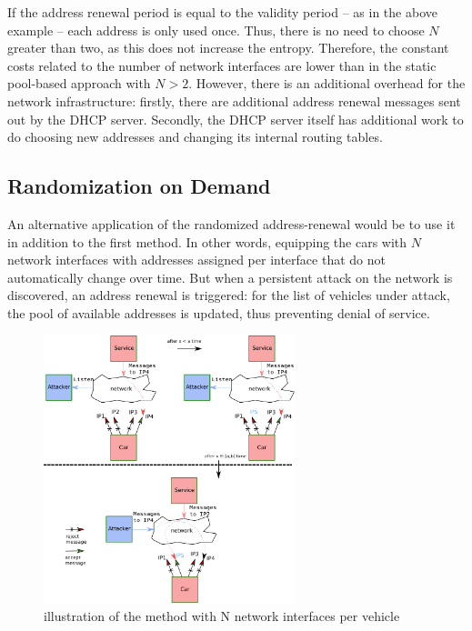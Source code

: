 If the address renewal period is equal to the validity period -- as in
the above example -- each address is only used once. Thus, there is no
need to choose $N$ greater than two, as this does not increase the
entropy. Therefore, the constant costs related to the number of
network interfaces are lower than in the static pool-based approach
with $N > 2$. However, there is an additional overhead for the network
infrastructure: firstly, there are additional address renewal messages
sent out by the DHCP server. Secondly, the DHCP server itself has
additional work to do choosing new addresses and changing its internal
routing tables.

\subsection{Randomization on Demand}

An alternative application of the randomized address-renewal would be
to use it in addition to the first method. In other words, equipping
the cars with $N$ network interfaces with addresses assigned per
interface that do not automatically change over time. But when a
persistent attack on the network is discovered, an address renewal is
triggered: for the list of vehicles under attack, the pool of
available addresses is updated, thus preventing denial of service.


\begin{figure}[h]
    \centering
	\includegraphics[width=0.65\textwidth]{schema/new3.pdf}
    \caption{illustration of the method with N network interfaces per vehicle}
    \label{Random1}
\end{figure}

